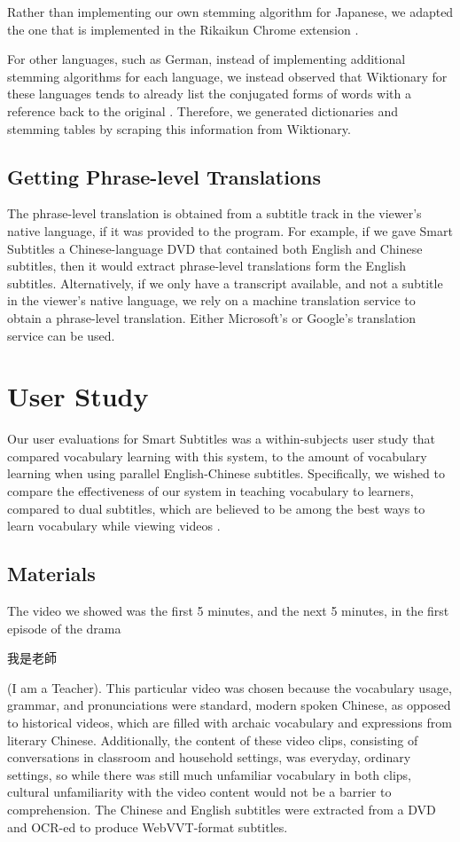 \documentclass{sigchi}
\begin{document}
Rather than implementing our own stemming algorithm for Japanese, we adapted the one that is implemented in the Rikaikun Chrome extension \cite{rikaikun}.

For other languages, such as German, instead of implementing additional stemming algorithms for each language, we instead observed that Wiktionary for these languages tends to already list the conjugated forms of words with a reference back to the original \cite{wiktionary}. Therefore, we generated dictionaries and stemming tables by scraping this information from Wiktionary.

\subsection{Getting Phrase-level Translations}

The phrase-level translation is obtained from a subtitle track in the viewer's native language, if it was provided to 
the program. For example, if we gave Smart Subtitles a Chinese-language DVD
that contained both English and Chinese subtitles, then it would
extract phrase-level translations form the English subtitles.
Alternatively, if we only have a transcript available, and not a subtitle in the viewer's native language, we rely on a machine translation service to obtain a phrase-level translation. Either Microsoft's or Google's translation service can be used.

\section{User Study}

Our user evaluations for Smart Subtitles was a within-subjects user study that compared vocabulary learning with this system, to the amount of vocabulary learning when using parallel English-Chinese subtitles. Specifically, we wished to compare the effectiveness of our system in teaching vocabulary to learners, compared to dual subtitles, which are believed to be among the best ways to learn vocabulary while viewing videos \cite{raine2012incidental}.

\subsection{Materials}

The video we showed was the first 5 minutes, and the next 5 minutes, in the first episode of the drama \begin{CJK}{UTF8}{min}我是老師\end{CJK} (I am a Teacher). This particular video was chosen because the vocabulary usage, grammar, and pronunciations were standard, modern spoken Chinese, as opposed to historical videos, which are filled with archaic vocabulary and expressions from literary Chinese. Additionally, the content of these video clips, consisting of conversations in classroom and household settings, was everyday, ordinary settings, so while there was still much unfamiliar vocabulary in both clips, cultural unfamiliarity with the video content would not be a barrier to comprehension. The Chinese and English subtitles were extracted from a DVD and OCR-ed to produce WebVVT-format subtitles.
\end{document}
